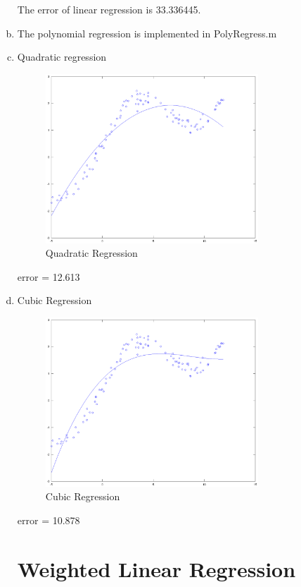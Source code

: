 \documentclass[a4paper, 12pt, titlepage]{article}
\begin{document}
\begin{enumerate}[(a)]
            The error of linear regression is 33.336445.
        \item The polynomial regression is implemented in PolyRegress.m
        \item Quadratic regression
            \begin{figure}[H]
                \centering
                \includegraphics[width=8cm]{fig/e.eps}
                \caption{Quadratic Regression}\label{e}
            \end{figure}

            error = 12.613

        \item Cubic Regression
            \begin{figure}[H]
                \centering
                \includegraphics[width=8cm]{fig/f.eps}
                \caption{Cubic Regression}\label{f}
            \end{figure}

            error = 10.878


\section{Weighted Linear Regression}
            

\end{enumerate}
\end{document}
